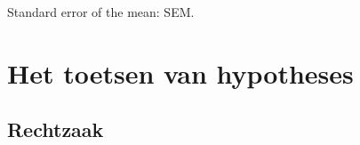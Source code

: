 \documentclass[
  a4paper,
]{scrbook}
\theoremstyle{definition}
\theoremstyle{definition}
\theoremstyle{remark}
\begin{document}
Standard error of the mean: SEM.

\chapter{Het toetsen van hypotheses}\label{het-toetsen-van-hypotheses}

\renewcommand{\ttdefault}{lcmtt}
\providecommand{\ped}[1]{_\textrm{#1}}
\providecommand{\ap}[1]{^\textrm{#1}}
\providecommand{\app}[1]{^\textrm{#1}}

\providecommand*{\angs}{\smash{\mathrm{\ring A}}}
\providecommand*{\celsius}{\mathrm{~\circ C}}
\providecommand*{\micro}{\mu}

\providecommand*{\unit}[1]{\textrm{\,#1}}

\providecommand{\E}{\mathrm{e}}
\providecommand{\I}{\mathrm{i}}
\providecommand{\sfrac}[2]{^{#1}/_{#2}}

\providecommand{\conc}[1]{\left[\mathrm{#1}\right]}

\providecommand{\command}[1]{\textsl{#1}}
\providecommand{\out}[1]{\begin{verbatim}#1\end{verbatim}}

\providecommand{\diff}{\mathrm{d}\,}

\providecommand*{\deriv}[3][]{%
    \frac{\diff^{#1}#2}{\diff #3^{#1}}}
\providecommand*{\pderiv}[3][]{%
    \frac{\partial^{#1}#2}
        {\partial #3^{#1}}}

\renewcommand{\vec}[1]{{\boldsymbol #1}}

\providecommand{\cov}[2]{\mathrm{Cov}\!\left(#1, #2\right)}
\providecommand{\var}[1]{\mathrm{Var}\!\left(#1\right)}

\providecommand{\mean}[1]{\overline{#1}}

\providecommand{\sd}[1]{\sigma\left(#1\right)}
\providecommand{\ev}[1]{\mathbb{E}\!\left(#1\right)}
\providecommand{\pr}[1]{\textrm{Pr}\!\left(#1\right)}

\providecommand{\se}[1]{\mathrm{SE}_{#1}}

\providecommand{\ct}[3]{t_{#1 (#2) #3}}

\providecommand{\HO}{H\ped{0}}
\providecommand{\HA}{H\ped{A}}
\providecommand{\df}{\mathrm{df}}

\section{Rechtzaak}\label{rechtzaak}
\end{document}
